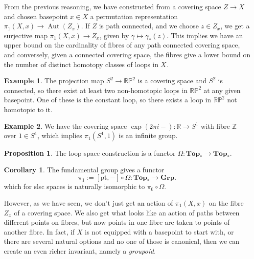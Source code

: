 \documentclass{tufte-handout}
\def\pt {\mathrm{pt}}
\def\Top {\mathbf{Top}}
\def\Grp {\mathbf{Grp}}
\def\RR{\mathbb{R}}
\def\ZZ{\mathbb{Z}}
\newcommand{\lecturenum}[1]{\marginnote{\color{red}Lecture #1}}
\DeclareMathOperator{\Aut}{Aut}
\theoremstyle{definition}
\newtheorem{prop}{Proposition}
\newtheorem{example}{Example}
\newtheorem{corollary}{Corollary}
\begin{document}
From the previous reasoning, we have constructed from a covering space $Z\to X$ and 
chosen basepoint $x\in X$ a permutation representation $\pi_1(X,x) \to \Aut(Z_x)$. If 
$Z$ is path connected, and we choose $z\in Z_x$, we get a surjective map $\pi_1(X,x) \to 
Z_x$, given by $\gamma\mapsto \gamma_*(z)$. This implies we have an upper bound on the 
cardinality of fibres of any path connected covering space, and conversely, given a 
connected covering space, the fibres give a lower bound on the number of distinct 
homotopy classes of loops in $X$.

\begin{example}
The projection map $S^2 \to \mathbb{RP}^2$ is a covering space and $S^2$ is connected, 
so there exist at least two non-homotopic loops in $\mathbb{RP}^2$ at any given 
basepoint. One of these is the constant loop, so there exists a loop in $\mathbb{RP}^2$ 
not homotopic to it.
\end{example}

\begin{example}\label{eg:piS^1_infinite}
We have the covering space $\exp(2\pi i-)\colon \RR\to S^1$ with fibre
$\ZZ$ over $1\in S^1$, which implies $\pi_1(S^1,1)$ is an infinite group.
\end{example}

\begin{prop}
The loop space construction is a functor $\Omega\colon \Top_*\to \Top_*$.
\end{prop}


\begin{corollary}
The fundamental group gives a functor 
\[
	\pi_1 := [\pt,-] \circ \Omega\colon \Top_*\to \Grp.
\]
which for slsc spaces is naturally isomorphic to $\pi_0\circ \Omega$.
\end{corollary}


However,\lecturenum{8} as we have seen, we don't just get an action of $\pi_1(X,x)$ on the fibre $Z_x$ 
of a covering space. We also get what looks like an action of paths between different 
points on fibres, but now points in one fibre are taken to points of another fibre. In 
fact, if $X$ is not equipped with a basepoint to start with, or there are several 
natural options and no one of those is canonical, then we can create an even richer 
invariant, namely a \emph{groupoid}.
\end{document}
